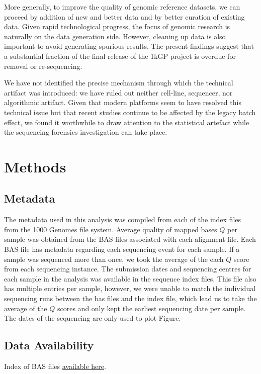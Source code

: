 \documentclass[9pt,lineno]{elife}
\begin{document}
More generally, to improve the quality of genomic reference datasets, we can proceed by addition of new and better data and by better curation of existing data.
Given rapid technological progress, the focus of genomic research is naturally on the data generation side. However, cleaning up data is also important to avoid generating spurious results. 
The present findings suggest that a substantial fraction of the final release of the 1kGP project is overdue for removal or re-sequencing. 

We have not identified the precise mechanism through which the technical artifact was introduced: we have ruled out neither cell-line, sequencer, nor algorithmic artifact. 
Given that modern platforms seem to have resolved this technical issue but that recent studies continue to be affected by the legacy batch effect, we found it worthwhile to draw attention to the statistical artefact while the sequencing forensics investigation can take place.     


\section{Methods}
\subsection{Metadata}
The metadata used in this analysis was compiled from each of the index files from the 1000 Genomes file system. 
Average quality of mapped bases $Q$ per sample was obtained from the BAS files associated with each alignment file. 
Each BAS file has metadata regarding each sequencing event for each sample. 
If a sample was sequenced more than once, we took the average of the each $Q$ score from each sequencing instance. 
The submission dates and sequencing centres for each sample in the analysis was available in the sequence index files.  
This file also has multiple entries per sample, however, we were unable to match the individual sequencing runs between the bas files and the index file, which lead us to take the average of the $Q$ scores and only kept the earliest sequencing date per sample. 
The dates of the sequencing are only used to plot Figure.

\subsection{Data Availability}

Index of BAS files \href{http://ftp.1000genomes.ebi.ac.uk/vol1/ftp/data_collections/1000_genomes_project/1000genomes.low_coverage.GRCh38DH.alignment.index}{available here}.
\end{document}
